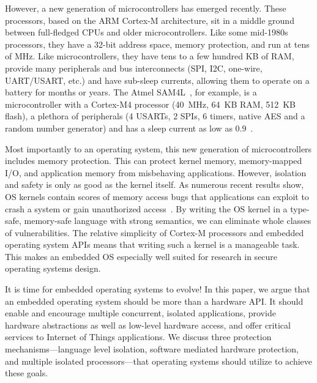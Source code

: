However, a new generation of microcontrollers has emerged recently.
These processors, based on the ARM Cortex-M architecture, sit in a middle ground
between full-fledged CPUs and older microcontrollers. Like some mid-1980s processors,
they have a 32-bit address space, memory protection, and run at tens of MHz.
Like microcontrollers, they have tens to a few hundred KB of RAM, provide many
peripherals and bus interconnects (SPI, I2C, one-wire, UART/USART, etc.) and
have sub-\uA sleep currents, allowing them to operate on a battery for
months or years. The Atmel SAM4L~\cite{sam4l}, for example, is a
microcontroller with a Cortex-M4 processor (40~MHz, 64~KB RAM, 512~KB flash), a
plethora of peripherals (4 USARTs, 2 SPIs, 6 timers, native AES and a random number
generator) and has a sleep current as low as $0.9$~\uA.

Most importantly to an operating system, this new generation of microcontrollers includes
memory protection.
This can protect kernel memory, memory-mapped I/O, and
application memory from misbehaving applications. However,
isolation and safety is only as good as the kernel itself. As numerous recent
results show, OS kernels contain scores of memory access bugs that applications
can exploit to crash a system or gain unauthorized
access~\cite{nickolai}. By writing the OS kernel in a type-safe, memory-safe
language with strong semantics, we can eliminate whole classes of
vulnerabilities. The relative simplicity of Cortex-M processors and embedded
operating system APIs means that writing such a kernel is a manageable task.
This makes an embedded OS especially well suited for research in
secure operating systems design.

It is time for embedded operating systems to evolve! In this paper, we argue
that an embedded operating system should be more than a hardware API.
It should enable and encourage
multiple concurrent, isolated applications, provide  hardware abstractions
as well as low-level hardware access, and offer critical services to Internet
of Things applications. We discuss three protection
mechanisms---language level isolation, software mediated hardware protection, and
multiple isolated processors---that operating systems should utilize to achieve
these goals.


%
